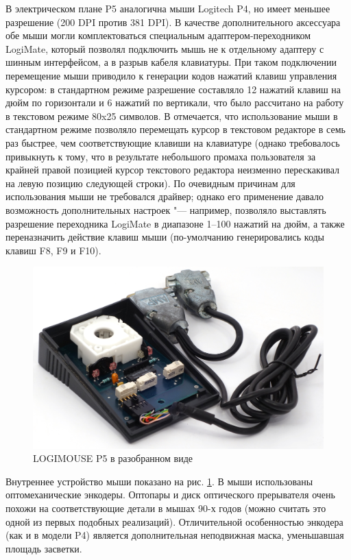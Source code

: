 \documentclass[11pt, a4paper]{article}
\begin{document}
В электрическом плане P5 аналогична мыши Logitech P4, но имеет меньшее разрешение (200 DPI против 381 DPI). В качестве дополнительного аксессуара обе мыши могли комплектоваться специальным адаптером-переходником LogiMate, который позволял подключить мышь не к отдельному адаптеру с шинным интерфейсом, а в разрыв кабеля клавиатуры. При таком подключении перемещение мыши приводило к генерации кодов нажатий клавиш управления курсором: в стандартном режиме разрешение составляло 12 нажатий клавиш на дюйм по горизонтали и 6 нажатий по вертикали, что было рассчитано на работу в текстовом режиме 80x25 символов. В \cite{logimouse} отмечается, что использование мыши в стандартном режиме позволяло перемещать курсор в текстовом редакторе в семь раз быстрее, чем соответствующие клавиши на клавиатуре (однако требовалось привыкнуть к тому, что в результате небольшого промаха пользователя за крайней правой позицией курсор текстового редактора неизменно перескакивал на левую позицию следующей строки). По очевидным причинам для использования мыши не требовался драйвер; однако его применение давало возможность дополнительных настроек "--- например, позволяло выставлять разрешение переходника LogiMate в диапазоне 1--100 нажатий на дюйм, а также переназначить действие клавиш мыши (по-умолчанию генерировались коды клавиш F8, F9 и F10).

 \begin{figure}[h]
    \centering
    \includegraphics[scale=0.7]{1983_logitech_logimouse_p5/inside_30.jpg}
    \caption{LOGIMOUSE P5 в разобранном виде}
    \label{fig:LogimouseP5Inside}
\end{figure}

Внутреннее устройство мыши показано на рис. \ref{fig:LogimouseP5Inside}. В мыши использованы оптомеханические энкодеры. Оптопары и диск оптического прерывателя очень похожи на соответствующие детали в мышах 90-х годов (можно считать это одной из первых подобных реализаций). Отличительной особенностью энкодера (как и в модели P4) является дополнительная неподвижная маска, уменьшавшая площадь засветки.
\end{document}
